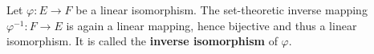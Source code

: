 Let $\varphi: E \rightarrow F$ be a linear isomorphism. The set-theoretic inverse mapping $\varphi^{-1}: F \rightarrow E$ is again a linear mapping, hence bijective and thus a linear isomorphism. It is called the \textbf{inverse isomorphism} of $\varphi$.
